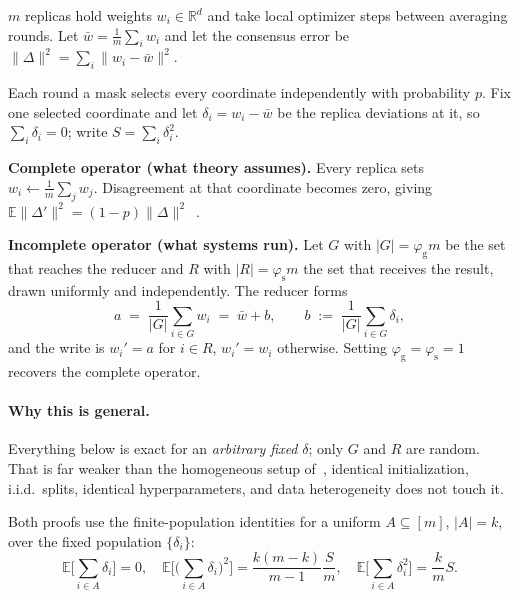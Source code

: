\documentclass{article}
\theoremstyle{plain}
\newcommand{\pg}{\varphi_{\mathrm{g}}}
\newcommand{\ps}{\varphi_{\mathrm{s}}}
\newcommand{\R}{\mathbb{R}}
\newcommand{\E}{\mathbb{E}}
\begin{document}

$m$ replicas hold weights $w_i \in \R^d$ and take local optimizer steps
between averaging rounds. Let $\bar w = \frac1m\sum_i w_i$ and let the
consensus error be $\|\Delta\|^2 = \sum_i\|w_i - \bar w\|^2$.

Each round a mask selects every coordinate independently with probability $p$.
Fix one selected coordinate and let $\delta_i = w_i - \bar w$ be the replica
deviations at it, so $\sum_i \delta_i = 0$; write $S = \sum_i \delta_i^2$.

\textbf{Complete operator (what theory assumes).} Every replica sets
$w_i \leftarrow \frac1m\sum_j w_j$. Disagreement at that coordinate becomes
zero, giving $\E\|\Delta'\|^2 = (1-p)\|\Delta\|^2$~\citep{ajanthan2026asyncmesh}.

\textbf{Incomplete operator (what systems run).} Let $G$ with $|G| = \pg m$ be
the set that reaches the reducer and $R$ with $|R| = \ps m$ the set that
receives the result, drawn uniformly and independently. The reducer forms
\begin{equation}
a \;=\; \frac{1}{|G|}\sum_{i\in G} w_i \;=\; \bar w + b,
\qquad b \;:=\; \frac{1}{|G|}\sum_{i\in G}\delta_i,
\end{equation}
and the write is $w_i' = a$ for $i \in R$, $w_i' = w_i$ otherwise.
Setting $\pg = \ps = 1$ recovers the complete operator.

\paragraph{Why this is general.} Everything below is exact for an
\emph{arbitrary fixed} $\delta$; only $G$ and $R$ are random. That is far
weaker than the homogeneous setup of~\citet{ajanthan2026asyncmesh}, identical
initialization, i.i.d.\ splits, identical hyperparameters, and data
heterogeneity does not touch it.



Both proofs use the finite-population identities for a uniform
$A \subseteq [m]$, $|A| = k$, over the fixed population $\{\delta_i\}$:
\begin{equation}\label{eq:fp}
\E\Big[\!\sum_{i\in A}\delta_i\Big] = 0,
\quad
\E\Big[\big(\!\sum_{i\in A}\delta_i\big)^2\Big] = \frac{k(m-k)}{m-1}\frac{S}{m},
\quad
\E\Big[\!\sum_{i\in A}\delta_i^2\Big] = \frac{k}{m}S .
\end{equation}
\end{document}
